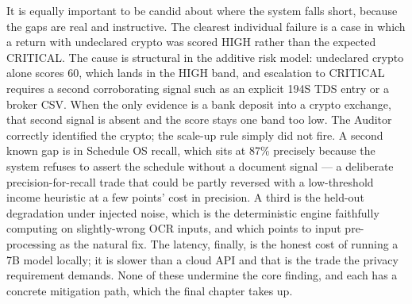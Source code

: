 It is equally important to be candid about where the system falls short, because
the gaps are real and instructive. The clearest individual failure is a case in
which a return with undeclared crypto was scored HIGH rather than the expected
CRITICAL. The cause is structural in the additive risk model: undeclared crypto
alone scores 60, which lands in the HIGH band, and escalation to CRITICAL
requires a second corroborating signal such as an explicit 194S TDS entry or a
broker CSV. When the only evidence is a bank deposit into a crypto exchange,
that second signal is absent and the score stays one band too low. The Auditor
correctly identified the crypto; the scale-up rule simply did not fire. A second
known gap is in Schedule OS recall, which sits at 87\% precisely because the
system refuses to assert the schedule without a document signal --- a deliberate
precision-for-recall trade that could be partly reversed with a low-threshold
income heuristic at a few points' cost in precision. A third is the held-out
degradation under injected noise, which is the deterministic engine faithfully
computing on slightly-wrong OCR inputs, and which points to input pre-processing
as the natural fix. The latency, finally, is the honest cost of running a 7B
model locally; it is slower than a cloud API and that is the trade the privacy
requirement demands. None of these undermine the core finding, and each has a
concrete mitigation path, which the final chapter takes up.
